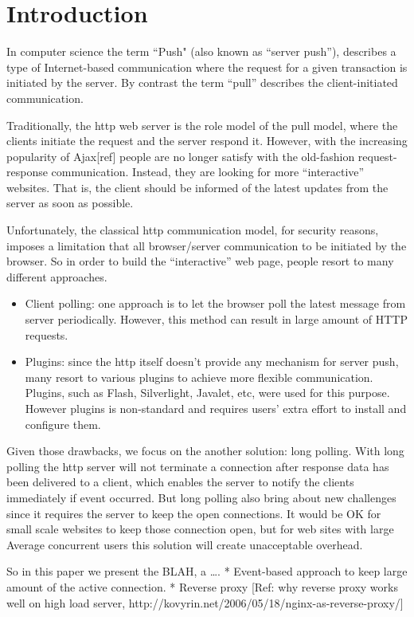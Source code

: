 \section {Introduction}
In computer science the term ``Push" (also known as ``server push''), describes a type of Internet-based communication where the request for a given transaction is initiated by the server. By contrast the term “pull” describes the client-initiated communication.

Traditionally, the http web server is the role model of the pull model, where the clients initiate the request and the server respond it. However, with the increasing popularity of Ajax[ref] people are no longer satisfy with the old-fashion request-response communication. Instead, they are looking for more “interactive” websites. That is, the client should be informed of the latest updates from the server as soon as possible.  

Unfortunately, the classical http communication model, for security reasons, imposes a limitation that all browser/server communication to be initiated by the browser. So in order to build the “interactive” web page, people resort to many different approaches.

\begin{itemize}
\item Client polling: one approach is to let the browser poll the latest message from server periodically. However, this method can result in large amount of HTTP requests.
\item Plugins: since the http itself doesn't provide any mechanism for server push, many resort to various plugins to achieve more flexible communication. Plugins, such as Flash, Silverlight, Javalet, etc, were used for this purpose. However plugins is non-standard and requires users' extra effort to install and configure them. 
\end{itemize}

Given those drawbacks, we focus on the another solution: long polling.  With long polling the http server will not terminate a connection after response data has been delivered to a client, which enables the server to notify the clients immediately if event occurred. But long polling also bring about new challenges since it requires the server to keep the open connections. It would be OK for small scale websites to keep those connection open, but for web sites with large Average concurrent users this solution will create unacceptable overhead.

So in this paper we present the BLAH, a ….
* Event-based approach to keep large amount of the active connection. 
* Reverse proxy [Ref: why reverse proxy works well on high load server, http://kovyrin.net/2006/05/18/nginx-as-reverse-proxy/]


